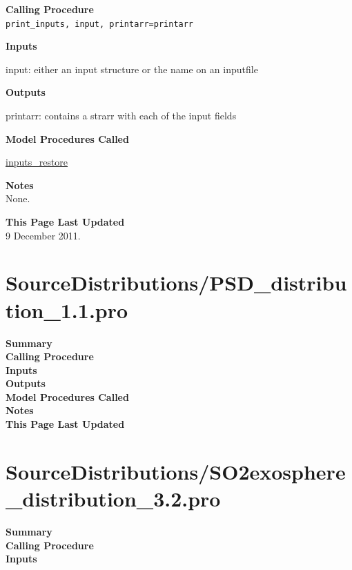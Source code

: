 \documentclass[11pt]{article}
\newcommand\descrip[1]{\textsf{\textbf{\large{#1}}}\\}
\begin{document}
\descrip{Calling Procedure}
\verb+print_inputs, input, printarr=printarr+

\descrip{Inputs}
\begin{compactenum} \listup
\item input: either an input structure or the name on an inputfile
\end{compactenum}

\descrip{Outputs}
\begin{compactenum} \listup
\item printarr: contains a strarr with each of the input fields
\end{compactenum}

\descrip{Model Procedures Called}
\begin{compactenum} \listup
\item \hyperref[sec:inputs_restore]{inputs\_restore}
\end{compactenum}

\descrip{Notes}
None.

\descrip{This Page Last Updated}
9 December 2011.

\clearpage

\section{SourceDistributions/PSD\_distribution\_1.1.pro}
\label{sec:PSD_distribution}

\descrip{Summary}

\descrip{Calling Procedure}

\descrip{Inputs}

\descrip{Outputs}

\descrip{Model Procedures Called}

\descrip{Notes}

\descrip{This Page Last Updated}

\clearpage

\section{SourceDistributions/SO2exosphere\_distribution\_3.2.pro}
\label{sec:SO2exosphere_distribution}

\descrip{Summary}

\descrip{Calling Procedure}

\descrip{Inputs}
\end{document}
